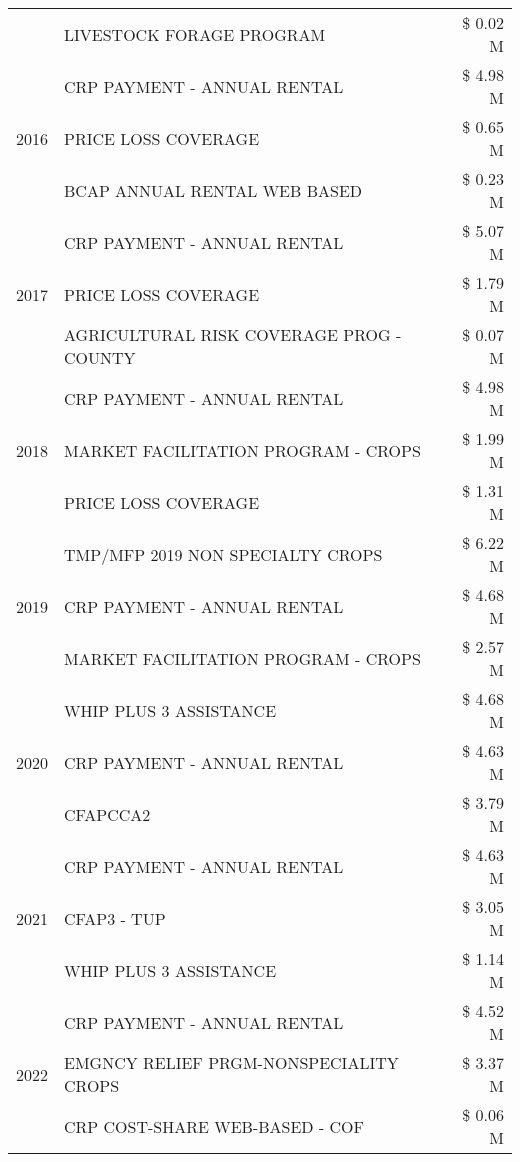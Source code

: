 \begin{tabular}{llr}
 & LIVESTOCK FORAGE PROGRAM & \$ 0.02 M \\
\cline{1-3}
\multirow[t]{3}{*}{2016} & CRP PAYMENT - ANNUAL RENTAL & \$ 4.98 M \\
 & PRICE LOSS COVERAGE & \$ 0.65 M \\
 & BCAP ANNUAL RENTAL WEB BASED & \$ 0.23 M \\
\cline{1-3}
\multirow[t]{3}{*}{2017} & CRP PAYMENT - ANNUAL RENTAL & \$ 5.07 M \\
 & PRICE LOSS COVERAGE & \$ 1.79 M \\
 & AGRICULTURAL RISK COVERAGE PROG - COUNTY & \$ 0.07 M \\
\cline{1-3}
\multirow[t]{3}{*}{2018} & CRP PAYMENT - ANNUAL RENTAL & \$ 4.98 M \\
 & MARKET FACILITATION PROGRAM - CROPS & \$ 1.99 M \\
 & PRICE LOSS COVERAGE & \$ 1.31 M \\
\cline{1-3}
\multirow[t]{3}{*}{2019} & TMP/MFP 2019 NON SPECIALTY CROPS & \$ 6.22 M \\
 & CRP PAYMENT - ANNUAL RENTAL & \$ 4.68 M \\
 & MARKET FACILITATION PROGRAM - CROPS & \$ 2.57 M \\
\cline{1-3}
\multirow[t]{3}{*}{2020} & WHIP PLUS 3 ASSISTANCE & \$ 4.68 M \\
 & CRP PAYMENT - ANNUAL RENTAL & \$ 4.63 M \\
 & CFAPCCA2 & \$ 3.79 M \\
\cline{1-3}
\multirow[t]{3}{*}{2021} & CRP PAYMENT - ANNUAL RENTAL & \$ 4.63 M \\
 & CFAP3 - TUP & \$ 3.05 M \\
 & WHIP PLUS 3 ASSISTANCE & \$ 1.14 M \\
\cline{1-3}
\multirow[t]{3}{*}{2022} & CRP PAYMENT - ANNUAL RENTAL & \$ 4.52 M \\
 & EMGNCY RELIEF PRGM-NONSPECIALITY CROPS & \$ 3.37 M \\
 & CRP COST-SHARE WEB-BASED - COF & \$ 0.06 M \\
\cline{1-3}
\bottomrule
\end{tabular}
